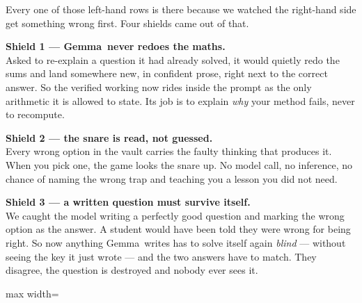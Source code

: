 \documentclass[11pt]{article}
\newcommand{\themodel}{Gemma}
\begin{document}
\vspace{0.2em}
Every one of those left-hand rows is there because we watched the right-hand
side get something wrong first. Four shields came out of that.

\begin{shieldbox}
\textbf{Shield 1 --- \themodel\ never redoes the maths.}\\
Asked to re-explain a question it had already solved, it would quietly redo the
sums and land somewhere new, in confident prose, right next to the correct
answer. So the verified working now rides inside the prompt as the only
arithmetic it is allowed to state. Its job is to explain \emph{why} your method
fails, never to recompute.
\end{shieldbox}

\begin{shieldbox}
\textbf{Shield 2 --- the snare is read, not guessed.}\\
Every wrong option in the vault carries the faulty thinking that produces it.
When you pick one, the game looks the snare up. No model call, no inference, no
chance of naming the wrong trap and teaching you a lesson you did not need.
\end{shieldbox}

\begin{shieldbox}
\textbf{Shield 3 --- a written question must survive itself.}\\
We caught the model writing a perfectly good question and marking the wrong
option as the answer. A student would have been told they were wrong for being
right. So now anything \themodel\ writes has to solve itself again \emph{blind}
--- without seeing the key it just wrote --- and the two answers have to match.
They disagree, the question is destroyed and nobody ever sees it.
\end{shieldbox}

\vspace{0.4em}
\begin{center}
\begin{adjustbox}{max width=\textwidth}
\end{adjustbox}
\end{center}
\end{document}
